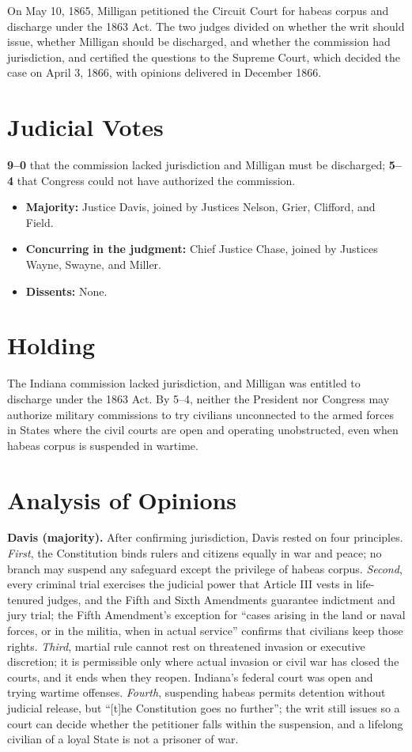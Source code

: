 \documentclass[12pt]{article}
\begin{document}
On May 10, 1865, Milligan petitioned the Circuit Court for habeas corpus and discharge under the 1863 Act. The two judges divided on whether the writ should issue, whether Milligan should be discharged, and whether the commission had jurisdiction, and certified the questions to the Supreme Court, which decided the case on April 3, 1866, with opinions delivered in December 1866.

\section{Judicial Votes}

\textbf{9--0} that the commission lacked jurisdiction and Milligan must be discharged; \textbf{5--4} that Congress could not have authorized the commission.
\begin{itemize}
\item \textbf{Majority:} Justice Davis, joined by Justices Nelson, Grier, Clifford, and Field.
\item \textbf{Concurring in the judgment:} Chief Justice Chase, joined by Justices Wayne, Swayne, and Miller.
\item \textbf{Dissents:} None.
\end{itemize}

\section{Holding}

The Indiana commission lacked jurisdiction, and Milligan was entitled to discharge under the 1863 Act. By 5--4, neither the President nor Congress may authorize military commissions to try civilians unconnected to the armed forces in States where the civil courts are open and operating unobstructed, even when habeas corpus is suspended in wartime.

\section{Analysis of Opinions}

\textbf{Davis (majority).} After confirming jurisdiction, Davis rested on four principles. \textit{First}, the Constitution binds rulers and citizens equally in war and peace; no branch may suspend any safeguard except the privilege of habeas corpus. \textit{Second}, every criminal trial exercises the judicial power that Article III vests in life-tenured judges, and the Fifth and Sixth Amendments guarantee indictment and jury trial; the Fifth Amendment's exception for ``cases arising in the land or naval forces, or in the militia, when in actual service'' confirms that civilians keep those rights. \textit{Third}, martial rule cannot rest on threatened invasion or executive discretion; it is permissible only where actual invasion or civil war has closed the courts, and it ends when they reopen. Indiana's federal court was open and trying wartime offenses. \textit{Fourth}, suspending habeas permits detention without judicial release, but ``[t]he Constitution goes no further''; the writ still issues so a court can decide whether the petitioner falls within the suspension, and a lifelong civilian of a loyal State is not a prisoner of war.
\end{document}
